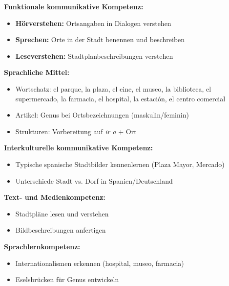 \documentclass[11pt,a4paper]{article}
\begin{document}
\vspace{1em}

\begin{kompetenzbox}

\textbf{Funktionale kommunikative Kompetenz:}
\begin{itemize}[nosep]
    \item \textbf{Hörverstehen:} Ortsangaben in Dialogen verstehen
    \item \textbf{Sprechen:} Orte in der Stadt benennen und beschreiben
    \item \textbf{Leseverstehen:} Stadtplanbeschreibungen verstehen
\end{itemize}

\textbf{Sprachliche Mittel:}
\begin{itemize}[nosep]
    \item Wortschatz: el parque, la plaza, el cine, el museo, la biblioteca, el supermercado, la farmacia, el hospital, la estación, el centro comercial
    \item Artikel: Genus bei Ortsbezeichnungen (maskulin/feminin)
    \item Strukturen: Vorbereitung auf \textit{ir a} + Ort
\end{itemize}

\textbf{Interkulturelle kommunikative Kompetenz:}
\begin{itemize}[nosep]
    \item Typische spanische Stadtbilder kennenlernen (Plaza Mayor, Mercado)
    \item Unterschiede Stadt vs. Dorf in Spanien/Deutschland
\end{itemize}

\textbf{Text- und Medienkompetenz:}
\begin{itemize}[nosep]
    \item Stadtpläne lesen und verstehen
    \item Bildbeschreibungen anfertigen
\end{itemize}

\textbf{Sprachlernkompetenz:}
\begin{itemize}[nosep]
    \item Internationalismen erkennen (hospital, museo, farmacia)
    \item Eselsbrücken für Genus entwickeln
\end{itemize}

\end{kompetenzbox}
\end{document}
